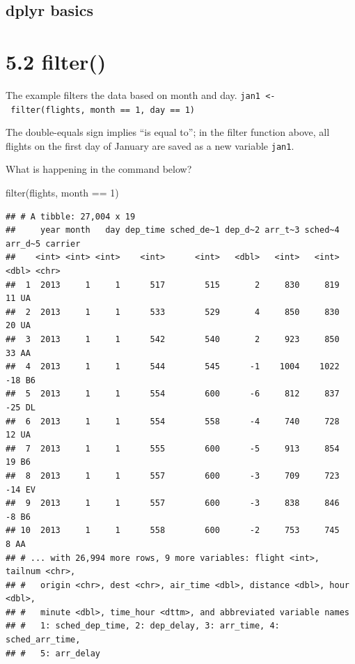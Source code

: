 \documentclass[
]{article}
\newenvironment{Shaded}{\begin{snugshade}}{\end{snugshade}}
\newcommand{\DecValTok}[1]{\textcolor[rgb]{0.00,0.00,0.81}{#1}}
\newcommand{\FunctionTok}[1]{\textcolor[rgb]{0.00,0.00,0.00}{#1}}
\newcommand{\NormalTok}[1]{#1}
\newcommand{\SpecialCharTok}[1]{\textcolor[rgb]{0.00,0.00,0.00}{#1}}
\begin{document}
\hypertarget{dplyr-basics}{%
\subsection{dplyr basics}\label{dplyr-basics}}

\hypertarget{filter}{%
\section{5.2 filter()}\label{filter}}

The example filters the data based on month and day.
\texttt{jan1\ \textless{}-\ filter(flights,\ month\ ==\ 1,\ day\ ==\ 1)}

The double-equals sign implies ``is equal to''; in the filter function
above, all flights on the first day of January are saved as a new
variable \texttt{jan1}.

What is happening in the command below?

\begin{Shaded}
\begin{Highlighting}[]
\FunctionTok{filter}\NormalTok{(flights, month }\SpecialCharTok{==} \DecValTok{1}\NormalTok{)}
\end{Highlighting}
\end{Shaded}

\begin{verbatim}
## # A tibble: 27,004 x 19
##     year month   day dep_time sched_de~1 dep_d~2 arr_t~3 sched~4 arr_d~5 carrier
##    <int> <int> <int>    <int>      <int>   <dbl>   <int>   <int>   <dbl> <chr>  
##  1  2013     1     1      517        515       2     830     819      11 UA     
##  2  2013     1     1      533        529       4     850     830      20 UA     
##  3  2013     1     1      542        540       2     923     850      33 AA     
##  4  2013     1     1      544        545      -1    1004    1022     -18 B6     
##  5  2013     1     1      554        600      -6     812     837     -25 DL     
##  6  2013     1     1      554        558      -4     740     728      12 UA     
##  7  2013     1     1      555        600      -5     913     854      19 B6     
##  8  2013     1     1      557        600      -3     709     723     -14 EV     
##  9  2013     1     1      557        600      -3     838     846      -8 B6     
## 10  2013     1     1      558        600      -2     753     745       8 AA     
## # ... with 26,994 more rows, 9 more variables: flight <int>, tailnum <chr>,
## #   origin <chr>, dest <chr>, air_time <dbl>, distance <dbl>, hour <dbl>,
## #   minute <dbl>, time_hour <dttm>, and abbreviated variable names
## #   1: sched_dep_time, 2: dep_delay, 3: arr_time, 4: sched_arr_time,
## #   5: arr_delay
\end{verbatim}
\end{document}
